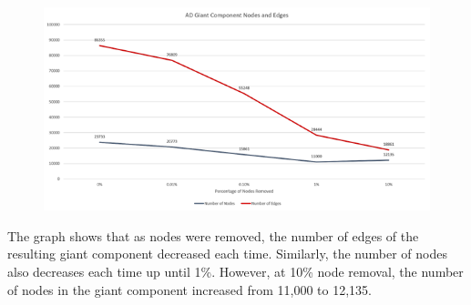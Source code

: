 \documentclass[conference]{IEEEtran}
\begin{document}
			\begin{figure}[htbp]
				\centerline{\includegraphics[width=\linewidth]{./images/robust_ad_component.png}}
				\label{robust_ad_component}
			\end{figure}
			{
				The graph shows that as nodes were removed, the number of edges of the resulting giant component decreased each time. Similarly, the number of nodes also decreases each time up until 1\%. However, at 10\% node removal, the number of nodes in the giant component increased from 11,000 to 12,135.
			\par}
			
\end{document}
